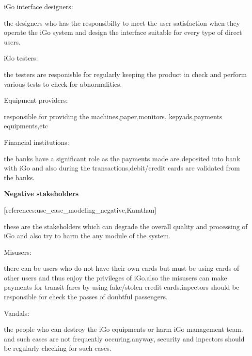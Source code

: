 \documentclass[12pt]{article}
\begin{document}
\vspace{\baselineskip}
iGo interface designers:\par

the designers who has the responsibilty to meet the user satisfaction when they operate the iGo system and design the interface suitable for every type of direct users.\par

iGo testers:\par

the testers are responisble for regularly keeping the product in check and perform various tests to check for abnormalities.\par


\vspace{\baselineskip}
Equipment providers:\par

responsible for providing the machines,paper,monitors, kepyads,payments equipments,etc\par


\vspace{\baselineskip}
Financial institutions:\par

the banks have a significant role as the payments made are deposited into bank with iGo and also during the transactions,debit/credit cards are validated from the banks.\par


\vspace{\baselineskip}
{\fontsize{16pt}{19.2pt}\selectfont \textbf{Negative stakeholders}\par}[references:use\_case\_modeling\_negative,Kamthan]\par

these are the stakeholders which can degrade the overall quality and processing of iGo and also try to harm the any module of the system.\par


\vspace{\baselineskip}
Misusers:\par

there can be users who do not have their own cards but must be using cards of other users and thus enjoy the privileges of iGo.also the misusers can make payments for transit fares by using fake/stolen credit cards.inpectors should be responsible for check the passes of doubtful passengers.\par


\vspace{\baselineskip}

\vspace{\baselineskip}

\vspace{\baselineskip}
Vandals:\par

the people who can destroy the iGo equipments or harm iGo management team. and such cases are not frequently occuring.anyway, security and inpectors should be regularly checking for such cases.\par


\vspace{\baselineskip}

\printbibliography
\end{document}
